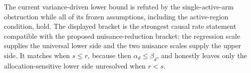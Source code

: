 The current variance-driven lower bound is refuted by the single-active-arm obstruction while all of its frozen assumptions, including the active-region condition, hold.  The displayed bracket is the strongest causal rate statement compatible with the proposed nuisance-reduction bracket: the regression scale supplies the universal lower side and the two nuisance scales supply the upper side.  It matches when \(s\leq r\), because then \(\alpha_d\leq\beta_d\), and honestly leaves only the allocation-sensitive lower side unresolved when \(r<s\).